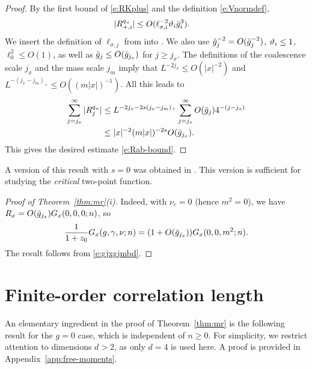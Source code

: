 \begin{proof}
By the first bound of \eqref{e:RKplus} and the definition \eqref{e:Vnormdef},
\begin{align}
\label{e:vq-new}
    |R^{q_u}_{+,i}|
&
\le O(\ell_{\sigma,i}^{-2}\vartheta_i\bar{g}_i^{3}).
\end{align}
We insert the definition of $\ell_{\sigma,j}$ from  into .
We also use $\tilde{g}_j^{-2} = O(\bar{g}_j^{-2})$, $\vartheta_i \le 1$, $\ell_0^2 \le O(1)$,
as well as $\bar{g}_{j} \leq O(\bar{g}_{j_{x}})$ for $j \geq j_x$.
The definitions of
the coalescence scale $j_x$ and the mass scale $j_m$ imply that  $L^{-2j_x} \le O(|x|^{-2})$
and $L^{ -  (j_{x} - j_m)_+} \le O((m|x|)^{-1})$.
All this leads to
\begin{align}
\sum_{j = j_{x}}^\infty |R^{q_u}_j|
&\leq
L^{-2j_{x} - 2s (j_{x} - j_m)_+}
\sum_{j = j_{x}}^\infty O(\bar{g}_{j}) 4^{-(j - j_{x})}
\nonumber \\
&\leq
|x|^{-2} (m|x|)^{-2s} O(\bar{g}_{j_{x}})
.
\label{e:vq-sum}
\end{align}
This gives the desired estimate \eqref{e:Rab-bound}.
\end{proof}

A version of this result with $s = 0$ was obtained in \cite{BBS-saw4,ST-phi4}.
This version is sufficient for studying the \emph{critical} two-point function.

\begin{proof}[Proof of Theorem~\ref{thm:mr}(i)]
Indeed, with $\nu_c = 0$ (hence $m^2 = 0$), we have $R_x = O(\bar{g}_{j_x}) G_x(0, 0, 0; n)$,
so
\begin{equation}
\frac{1}{1 + z_0} G_x(g, \gamma, \nu; n)
	=
(1 + O(\bar{g}_{j_x})) G_x(0, 0, m^2; n).
\end{equation}
The result follows from \eqref{e:gjxgjmbd}.
\end{proof}


\section{Finite-order correlation length}

An elementary ingredient in the proof of Theorem~\ref{thm:mr} is the following result for
the $g=0$ case, which is independent of $n\ge 0$.
For simplicity, we restrict attention to dimensions $d>2$, as only $d=4$ is used here.
A proof is provided in Appendix~\ref{app:free-moments}.

